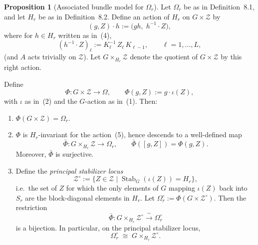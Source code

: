 \documentclass{article}
\theoremstyle{definition}
\newtheorem{proposition}[theorem]{Proposition}
\begin{document}
\begin{proposition}[Associated bundle model for $\Omega_r$]\label{prop:associated-bundle}
Let $\Omega_r$ be as in Definition~8.1, and let $H_r$ be as in Definition~8.2. Define an action of $H_r$ on $G \times \mathcal{Z}$ by
\begin{equation}\tag{5}
(g, Z) \cdot h := \bigl(gh,\; h^{-1} \cdot Z\bigr),
\end{equation}
where for $h \in H_r$ written as in~(4),
\begin{equation}\tag{6}
(h^{-1} \cdot Z)_\ell := K_\ell^{-1}\, Z_\ell\, K_{\ell-1}, \qquad \ell = 1, \dots, L,
\end{equation}
(and $A$ acts trivially on $\mathcal{Z}$). Let $G \times_{H_r} \mathcal{Z}$ denote the quotient of $G \times \mathcal{Z}$ by this right action.

Define
\begin{equation}\tag{7}
\Phi \colon G \times \mathcal{Z} \to \Omega, \qquad \Phi(g, Z) := g \cdot \iota(Z),
\end{equation}
with $\iota$ as in~(2) and the $G$-action as in~(1). Then:
\begin{enumerate}
    \item $\Phi(G \times \mathcal{Z}) = \Omega_r$.
    \item $\Phi$ is $H_r$-invariant for the action~(5), hence descends to a well-defined map
    \[
        \bar\Phi \colon G \times_{H_r} \mathcal{Z} \longrightarrow \Omega_r, \qquad \bar\Phi([g, Z]) = \Phi(g, Z).
    \]
    Moreover, $\bar\Phi$ is surjective.
    \item Define the \emph{principal stabilizer locus}
    \[
        \mathcal{Z}^{\circ} := \bigl\{ Z \in \mathcal{Z} \;\big|\; \operatorname{Stab}_G(\iota(Z)) = H_r \bigr\},
    \]
    i.e.\ the set of $Z$ for which the only elements of $G$ mapping $\iota(Z)$ back into $S_r$ are the block-diagonal elements in $H_r$. Let $\Omega_r^{\circ} := \Phi(G \times \mathcal{Z}^{\circ})$. Then the restriction
    \[
        \bar\Phi \colon G \times_{H_r} \mathcal{Z}^{\circ} \xrightarrow{\;\sim\;} \Omega_r^{\circ}
    \]
    is a bijection. In particular, on the principal stabilizer locus,
    \begin{equation}\tag{8}
        \Omega_r^{\circ} \;\cong\; G \times_{H_r} \mathcal{Z}^{\circ}.
    \end{equation}
\end{enumerate}
\end{proposition}
\end{document}
